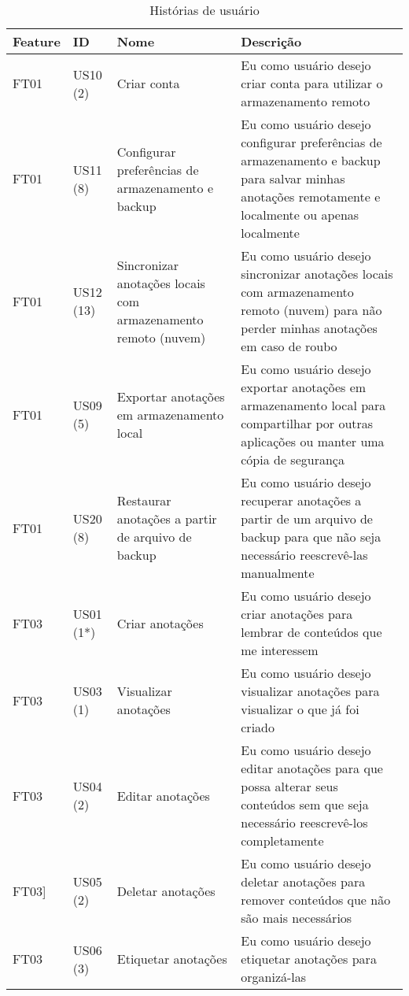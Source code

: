 \documentclass[
	12pt,				%
	oneside,			%
	a4paper,			%
	english,			%
	brazil,				%
	]{abntex2}
\begin{document}
\IBGEtabfontsize
\begin{longtable}{@{}p{}p{}p{}p{}@{}}
\caption{Histórias de usuário}
\label{tab:historias_de_usuario} \\
\toprule
\textbf{Feature} & \textbf{ID} & \textbf{Nome} & \textbf{Descrição} \\ \midrule
FT01 & US10 (2) & Criar conta & Eu como usuário desejo criar conta para utilizar o armazenamento remoto \\ \midrule
FT01 & US11 (8) & Configurar preferências de armazenamento e backup & Eu como usuário desejo configurar preferências de armazenamento e backup para salvar minhas anotações remotamente e localmente ou apenas localmente \\ \midrule
FT01 & US12 (13) & Sincronizar anotações locais com armazenamento remoto (nuvem) & Eu como usuário desejo sincronizar anotações locais com armazenamento remoto (nuvem) para não perder minhas anotações em caso de roubo \\ \midrule
FT01 & US09 (5) & Exportar anotações em armazenamento local & Eu como usuário desejo exportar anotações em armazenamento local para compartilhar por outras aplicações ou manter uma cópia de segurança \\ \midrule
FT01 & US20 (8) & Restaurar anotações a partir de arquivo de backup & Eu como usuário desejo recuperar anotações a partir de um arquivo de backup para que não seja necessário reescrevê-las manualmente \\ \midrule
FT03 & US01 (1*) & Criar anotações & Eu como usuário desejo criar anotações para lembrar de conteúdos que me interessem \\ \midrule
FT03 & US03 (1) & Visualizar anotações & Eu como usuário desejo visualizar anotações para visualizar o que já foi criado \\ \midrule
FT03 & US04 (2) & Editar anotações & Eu como usuário desejo editar anotações para que possa alterar seus conteúdos sem que seja necessário reescrevê-los completamente \\ \midrule
FT03]& US05 (2) & Deletar anotações & Eu como usuário desejo deletar anotações para remover conteúdos que não são mais necessários \\ \midrule
FT03 & US06 (3) & Etiquetar anotações & Eu como usuário desejo etiquetar anotações para organizá-las \\ \midrule

\end{longtable}
\end{document}
